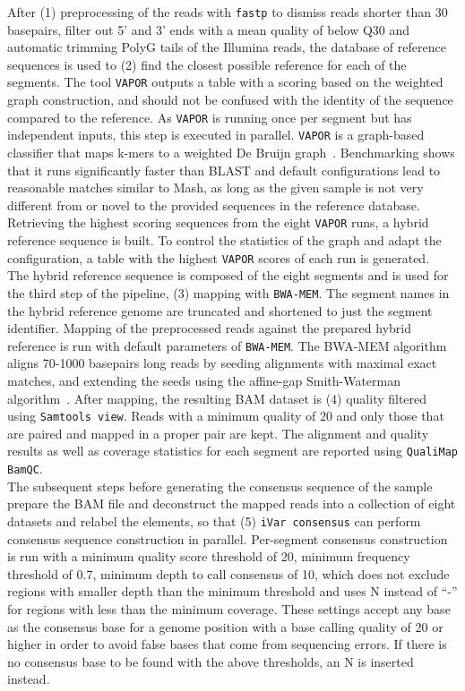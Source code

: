 After (1) preprocessing of the reads with \texttt{fastp} to dismiss reads shorter than 30 basepairs, filter out 5' and 3' ends with a mean quality of below Q30 and automatic trimming PolyG tails of the Illumina reads, the database of reference sequences is used to (2) find the closest possible reference for each of the segments. The tool \texttt{VAPOR} outputs a table with a scoring based on the weighted graph construction, and should not be confused with the identity of the sequence compared to the reference. As \texttt{VAPOR} is running once per segment but has independent inputs, this step is executed in parallel. \texttt{VAPOR} is a graph-based classifier that maps k-mers to a weighted De Bruijn graph~\cite{southgate2020influenza}. Benchmarking shows that it runs significantly faster than \ac{BLAST} and default configurations lead to reasonable matches similar to Mash, as long as the given sample is not very different from or novel to the provided sequences in the reference database. \\
Retrieving the highest scoring sequences from the eight \texttt{VAPOR} runs, a hybrid reference sequence is built. To control the statistics of the graph and adapt the configuration, a table with the highest \texttt{VAPOR} scores of each run is generated. \\
The hybrid reference sequence is composed of the eight segments and is used for the third step of the pipeline, (3) mapping with \texttt{BWA-MEM}. The segment names in the hybrid reference genome are truncated and shortened to just the segment identifier. Mapping of the preprocessed reads against the prepared hybrid reference is run with default parameters of \texttt{BWA-MEM}. The \ac{BWA-MEM} algorithm aligns 70-1000 basepairs long reads by seeding alignments with maximal exact matches, and extending the seeds using the affine-gap Smith-Waterman algorithm~\cite{li2013aligning}. After mapping, the resulting \ac{BAM} dataset is (4) quality filtered using \texttt{Samtools view}. Reads with a minimum quality of 20 and only those that are paired and mapped in a proper pair are kept. The alignment and quality results as well as coverage statistics for each segment are reported using \texttt{QualiMap BamQC}. \\
The subsequent steps before generating the consensus sequence of the sample prepare the \ac{BAM} file and deconstruct the mapped reads into a collection of eight datasets and relabel the elements, so that (5) \texttt{iVar consensus} can perform consensus sequence construction in parallel. Per-segment consensus construction is run with a minimum quality score threshold of 20, minimum frequency threshold of 0.7, minimum depth to call consensus of 10, which does not exclude regions with smaller depth than the minimum threshold and uses N instead of ``-'' for regions with less than the minimum coverage. These settings accept any base as the consensus base for a genome position with a base calling quality of 20 or higher in order to avoid false bases that come from sequencing errors. If there is no consensus base to be found with the above thresholds, an N is inserted instead. \\

